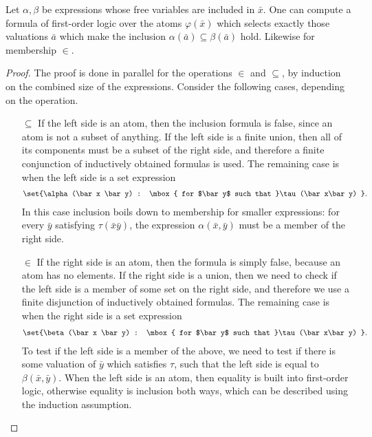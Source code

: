 \begin{itemize}
\begin{fact}\label{fact:expressions-to-fo}
	Let $\alpha,\beta$ be expressions whose free variables are included in $\bar x$. One can compute a formula of first-order logic over the atoms $\varphi(\bar x)$ which selects exactly those valuations $\bar a$ which make the inclusion $\alpha(\bar a) \subseteq \beta(\bar a)$ hold. Likewise for membership $\in$.
\end{fact}
\begin{proof}
	The proof is done in parallel for the operations $\in$ and $\subseteq$, by induction on the combined size of the expressions. Consider the following cases, depending on the operation.

	\begin{itemize}
		\item[$\subseteq$] If the left side is an atom, then the inclusion formula is false, since an atom is not a subset of anything. If the left side is a finite union, then all of its components must be a subset of the right side, and therefore a finite conjunction of inductively obtained formulas is used. The remaining case is when the left side is a set expression
		\begin{align*}
			\set{\alpha(\bar x \bar y) : \mbox{ for $\bar y$ such that }\tau(\bar x\bar y) }.
		\end{align*}
 In this case inclusion boils down to membership for smaller expressions: for every $\bar y$ satisfying $\tau(\bar x \bar y)$, the expression $\alpha(\bar x,\bar y)$ must be a member of the right side.
	
		\item[$\in$] If the right side is an atom, then the formula is simply false, because an atom has no elements.
		If the right side is a union, then we need to check if the left side is a member of some set on the right side, and therefore we use a finite disjunction of inductively obtained formulas. The remaining case is when the right side 
	is a set expression 
	\begin{align*}
			\set{\beta(\bar x \bar y) : \mbox{ for $\bar y$ such that }\tau(\bar x\bar y) }.
	\end{align*}
	To test if the left side is a member of the above, we need to test if there is some valuation of $ \bar y$ which satisfies $\tau$, such that the left side is equal to $\beta(\bar x,\bar y)$. When the left side is an atom, then equality is built into first-order logic, otherwise equality is inclusion both ways, which can be described using the induction assumption.
	\end{itemize}
	
\end{proof}

\end{itemize}


